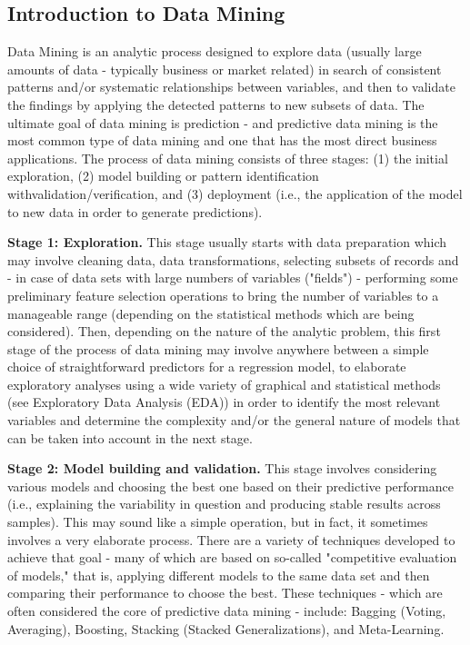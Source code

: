 \begin{description}
\section{Introduction to Data Mining}


Data Mining is an analytic process designed to explore data (usually large amounts of data - typically business or market related) in search of consistent patterns and/or systematic relationships between variables, and then to validate the findings by applying the detected patterns to new subsets of data. The ultimate goal of data mining is prediction - and predictive data mining is the most common type of data mining and one that has the most direct business applications. The process of data mining consists of three stages: (1) the initial exploration, (2) model building or pattern identification withvalidation/verification, and (3) deployment (i.e., the application of the model to new data in order to generate predictions).


\textbf{Stage 1: Exploration.} This stage usually starts with data preparation which may involve cleaning data, data transformations, selecting subsets of records and - in case of data sets with large numbers of variables ("fields") - performing some preliminary feature selection operations to bring the number of variables to a manageable range (depending on the statistical methods which are being considered). Then, depending on the nature of the analytic problem, this first stage of the process of data mining may involve anywhere between a simple choice of straightforward predictors for a regression model, to elaborate exploratory analyses using a wide variety of graphical and statistical methods (see Exploratory Data Analysis (EDA)) in order to identify the most relevant variables and determine the complexity and/or the general nature of models that can be taken into account in the next stage.


\textbf{Stage 2: Model building and validation.} This stage involves considering various models and choosing the best one based on their predictive performance (i.e., explaining the variability in question and producing stable results across samples). This may sound like a simple operation, but in fact, it sometimes involves a very elaborate process. There are a variety of techniques developed to achieve that goal - many of which are based on so-called "competitive evaluation of models," that is, applying different models to the same data set and then comparing their performance to choose the best. These techniques - which are often considered the core of predictive data mining - include: Bagging (Voting, Averaging), Boosting, Stacking (Stacked Generalizations), and Meta-Learning.



\end{description}
